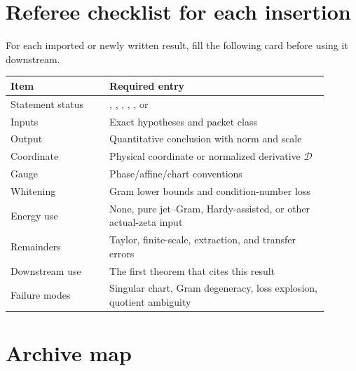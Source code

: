 \documentclass[11pt,a4paper]{amsart}
\newcommand{\Status}[1]{\textnormal{\fbox{\scriptsize\textsf{#1}}}}
\newcommand{\Core}{\Status{CORE}}
\newcommand{\Open}{\Status{OPEN}}
\newcommand{\Optional}{\Status{OPTIONAL}}
\newcommand{\Archive}{\Status{ARCHIVE}}
\newcommand{\Conditional}{\Status{CONDITIONAL}}
\newcommand{\Verified}{\Status{VERIFIED}}
\newcommand{\D}{\mathcal D}
\theoremstyle{plain}
\theoremstyle{definition}
\begin{document}
\section{Referee checklist for each insertion}
\label{sec:referee-checklist}

For each imported or newly written result, fill the following card before using it downstream.

\begin{center}
\begin{tabular}{p{0.28\linewidth}p{0.62\linewidth}}
\toprule
Item & Required entry \\
\midrule
Statement status & \Core, \Optional, \Open, \Conditional, \Verified, or \Archive \\
Inputs & Exact hypotheses and packet class \\
Output & Quantitative conclusion with norm and scale \\
Coordinate & Physical coordinate or normalized derivative \(\D\) \\
Gauge & Phase/affine/chart conventions \\
Whitening & Gram lower bounds and condition-number loss \\
Energy use & None, pure jet--Gram, Hardy-assisted, or other actual-zeta input \\
Remainders & Taylor, finite-scale, extraction, and transfer errors \\
Downstream use & The first theorem that cites this result \\
Failure modes & Singular chart, Gram degeneracy, loss explosion, quotient ambiguity \\
\bottomrule
\end{tabular}
\end{center}

\appendix

\section{Archive map}
\label{app:archive-map}
\end{document}
